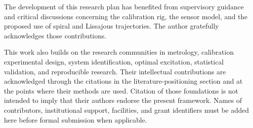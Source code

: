 \documentclass[11pt,a4paper]{article}
\begin{document}
The development of this research plan has benefited from supervisory guidance
and critical discussions concerning the calibration rig, the sensor model, and
the proposed use of spiral and Lissajous trajectories. The author gratefully
acknowledges those contributions.

This work also builds on the research communities in metrology, calibration
experimental design, system identification, optimal excitation, statistical
validation, and reproducible research. Their intellectual contributions are
acknowledged through the citations in the literature-positioning section and
at the points where their methods are used. Citation of those foundations is
not intended to imply that their authors endorse the present framework. Names
of contributors, institutional support, facilities, and grant identifiers must
be added here before formal submission when applicable.



\end{document}
